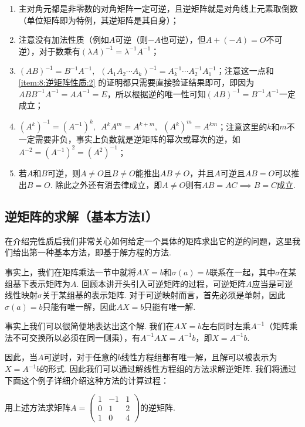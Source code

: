 \begin{enumerate}[label=(\arabic*)]
    \item 主对角元都是非零数的对角矩阵一定可逆，且逆矩阵就是对角线上元素取倒数（单位矩阵即为特例，其逆矩阵是其自身）；

    \item \label{item:8:逆矩阵性质:2}
          注意没有加法性质（例如$A$可逆（则$-A$也可逆），但$A+(-A)=O$不可逆），对于数乘有$(\lambda A)^{-1}=\lambda^{-1}A^{-1}$；

    \item \label{item:8:逆矩阵性质:3}
          $(AB)^{-1}=B^{-1}A^{-1},\enspace (A_1A_2\cdots A_k)^{-1}=A_k^{-1}\cdots A_2^{-1}A_1^{-1}$；注意这一点和 \ref*{item:8:逆矩阵性质:2} 的证明都只需要直接验证结果即可，即因为$ABB^{-1}A^{-1}=AA^{-1}=E$，所以根据逆的唯一性可知$(AB)^{-1}=B^{-1}A^{-1}$一定成立；

    \item $(A^k)^{-1}=(A^{-1})^k,\enspace A^kA^m=A^{k+m},\enspace (A^k)^m=A^{km}$；注意这里的$k$和$m$不一定需要非负，事实上负数就是逆矩阵的幂次或幂次的逆，如$A^{-2}=(A^{-1})^2=(A^2)^{-1}$；

    \item 若$A$和$B$可逆，则$A\neq O$且$B\neq O$能推出$AB\neq O$，并且$A$可逆且$AB=O$可以推出$B=O$. 除此之外还有消去律成立，即$A \neq O$则有$AB=AC \implies B=C$成立.
\end{enumerate}

\subsection{逆矩阵的求解（基本方法I）}

在介绍完性质后我们非常关心如何给定一个具体的矩阵求出它的逆的问题，这里我们给出第一种基本方法，即基于解方程的方法.

事实上，我们在矩阵乘法一节中就将$AX=b$和$\sigma(a)=b$联系在一起，其中$\sigma$在某组基下表示矩阵为$A$. 回顾本讲开头引入可逆矩阵的过程，可逆矩阵$A$应当是可逆线性映射$\sigma$关于某组基的表示矩阵. 对于可逆映射而言，首先必须是单射，因此$\sigma(a)=b$只能有唯一解，因此$AX=b$只能有唯一解.

事实上我们可以很简便地表达出这个解. 我们在$AX=b$左右同时左乘$A^{-1}$（矩阵乘法不可交换所以必须在同一侧乘），有$A^{-1}AX=A^{-1}b$，即$X=A^{-1}b$.

因此，当$A$可逆时，对于任意的$b$线性方程组都有唯一解，且解可以被表示为$X=A^{-1}b$的形式. 因此我们可以通过解线性方程组的方法求解逆矩阵. 我们将通过下面这个例子详细介绍这种方法的计算过程：
\begin{example}
    用上述方法求矩阵$A=\begin{pmatrix}1 & -1 & 1 \\ 0 & 1 & 2 \\ 1 & 0 & 4\end{pmatrix}$的逆矩阵.
\end{example}

